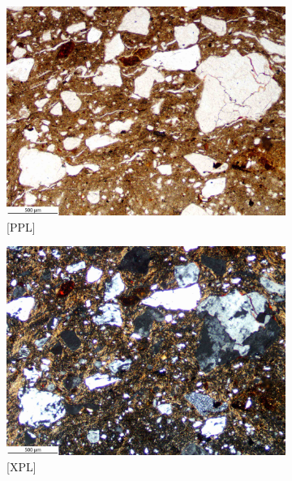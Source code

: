 \documentclass[a4paper]{article}
\begin{document}
\begin{figure}[H]
	\centering
	\begin{subfigure}[t]{.49\textwidth}
		\includegraphics[width=\textwidth]{ThinSections/6-1_4x_PPL.jpg}
		\caption{[PPL]}
	\end{subfigure}\hspace{.5em}\hfill
	\begin{subfigure}[t]{.49\textwidth}
		\includegraphics[width=\textwidth]{ThinSections/6-1_4x_XPL.jpg}
		\caption{[XPL]}
	\end{subfigure}
	\begin{subfigure}[t]{.24\textwidth}

\end{subfigure}
\end{figure}
\end{document}
